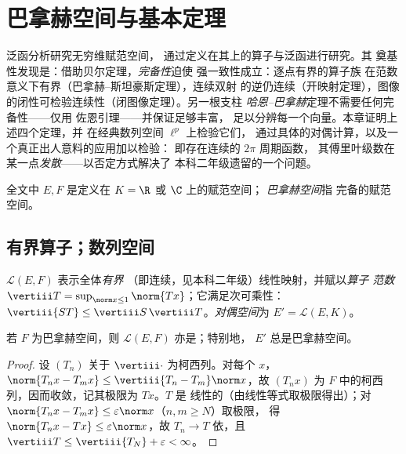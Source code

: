 \chapter{巴拿赫空间与基本定理}
\label{ch:b3:banach}

泛函分析研究无穷维赋范空间，
通过定义在其上的算子与泛函进行研究。其
奠基性发现是：借助贝尔定理，\emph{完备性}迫使
强一致性成立：逐点有界的算子族
在范数意义下有界（巴拿赫–斯坦豪斯定理），连续双射
的逆仍连续（开映射定理），图像
的闭性可检验连续性（闭图像定理）。另一根支柱
\emph{哈恩–巴拿赫}定理不需要任何完备性——仅用
佐恩引理——并保证足够丰富，
足以分辨每一个向量。本章证明上述四个定理，并
在经典数列空间 $\ell^p$ 上检验它们，
通过具体的对偶计算，以及一个真正出人意料的应用加以检验：
即存在连续的 $2\pi$ 周期函数，
其傅里叶级数在某一点\emph{发散}——以否定方式解决了
本科二年级遗留的一个问题。

全文中 $E, F$ 是定义在 $K = \R$ 或 $\C$ 上的赋范空间；
\emph{巴拿赫空间}指
完备的赋范空间。

\section{有界算子；数列空间}

\begin{definition}\label{def:b3:banach:operator}
$\mathcal L(E, F)$ 表示全体\emph{有界}
（即连续，见本科二年级）线性映射，并赋以\emph{算子
范数} $\vertiii T = \sup_{\norm x \leq
1}\norm{Tx}$；它满足次可乘性：$\vertiii{ST} \leq
\vertiii S\,\vertiii T$。\emph{对偶空间}为
$E' = \mathcal L(E, K)$。
\end{definition}

\begin{proposition}\label{prop:b3:banach:llcomplete}
若 $F$ 为巴拿赫空间，则 $\mathcal L(E, F)$ 亦是；特别地，
$E'$ 总是巴拿赫空间。
\end{proposition}

\begin{proof}
设 $(T_n)$ 关于 $\vertiii\cdot$ 为柯西列。对每个 $x$，
$\norm{T_nx - T_mx} \leq \vertiii{T_n - T_m}\norm x$，故 $(T_nx)$
为 $F$ 中的柯西列，因而收敛，记其极限为 $Tx$。$T$ 是
线性的（由线性等式取极限得出）；对
$\norm{T_nx - T_mx} \leq \varepsilon\norm x$（$n, m \geq N$）取极限，
得 $\norm{T_nx - Tx} \leq \varepsilon\norm x$，故 $T_n \to T$
依，且 $\vertiii T \leq \vertiii{T_N} +
\varepsilon < \infty$。
\end{proof}


